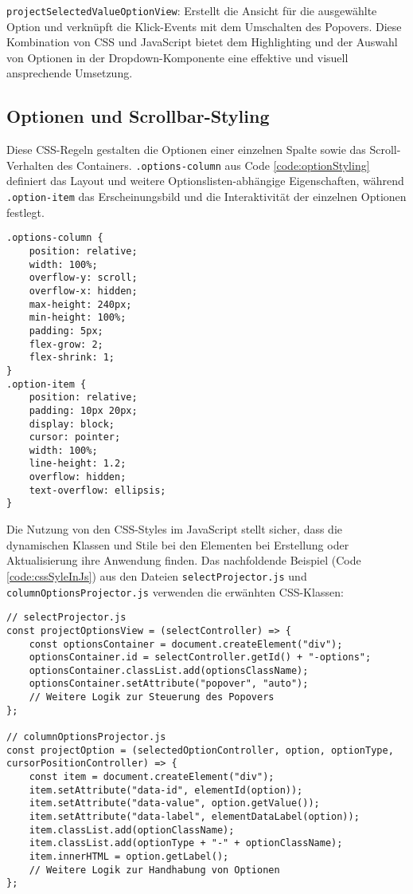 \texttt{projectSelectedValueOptionView}: Erstellt die Ansicht für die ausgewählte Option und verknüpft die Klick-Events mit dem Umschalten des Popovers.
Diese Kombination von CSS und JavaScript bietet dem Highlighting und der Auswahl von Optionen in der Dropdown-Komponente eine effektive und visuell ansprechende Umsetzung.


\subsection{Optionen und Scrollbar-Styling}
\label{sec:sizeLayoutChanges}

Diese CSS-Regeln gestalten die Optionen einer einzelnen Spalte sowie das Scroll-Verhalten des Containers. 
\texttt{.options-column} aus Code \ref{code:optionStyling} definiert das Layout und weitere Optionslisten-abhängige Eigenschaften, 
während \texttt{.option-item} das Erscheinungsbild und die Interaktivität der einzelnen Optionen festlegt.

\begin{lstlisting}[style = htmlcssjs, caption = Optionen und Scrollbar-Styling, label = code:optionStyling]
.options-column {
    position: relative;
    width: 100%;
    overflow-y: scroll;
    overflow-x: hidden;
    max-height: 240px;
    min-height: 100%;
    padding: 5px;
    flex-grow: 2;
    flex-shrink: 1;
}
.option-item {
    position: relative;
    padding: 10px 20px;
    display: block;
    cursor: pointer;
    width: 100%;
    line-height: 1.2;
    overflow: hidden;
    text-overflow: ellipsis;
} 
\end{lstlisting}

Die Nutzung von den CSS-Styles im JavaScript stellt sicher, dass die dynamischen Klassen und Stile bei den Elementen bei Erstellung oder Aktualisierung ihre Anwendung finden.
Das nachfoldende Beispiel (Code \ref{code:cssSyleInJs}) aus den Dateien \texttt{selectProjector.js} und \texttt{columnOptionsProjector.js} verwenden die erwänhten CSS-Klassen:

\begin{lstlisting}[style = htmlcssjs, caption = CSS-Styles im JavaScript, label = code:cssSyleInJs]
// selectProjector.js
const projectOptionsView = (selectController) => {
    const optionsContainer = document.createElement("div");
    optionsContainer.id = selectController.getId() + "-options";
    optionsContainer.classList.add(optionsClassName);
    optionsContainer.setAttribute("popover", "auto");
    // Weitere Logik zur Steuerung des Popovers
};

// columnOptionsProjector.js
const projectOption = (selectedOptionController, option, optionType, cursorPositionController) => {
    const item = document.createElement("div");
    item.setAttribute("data-id", elementId(option));
    item.setAttribute("data-value", option.getValue());
    item.setAttribute("data-label", elementDataLabel(option));
    item.classList.add(optionClassName);
    item.classList.add(optionType + "-" + optionClassName);
    item.innerHTML = option.getLabel();
    // Weitere Logik zur Handhabung von Optionen
}; 
\end{lstlisting}

